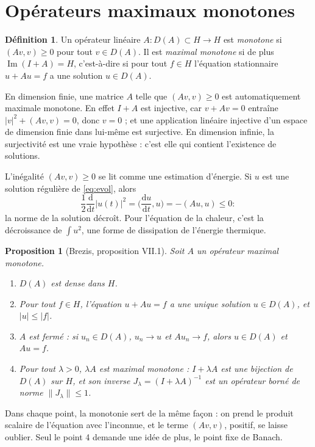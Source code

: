 \documentclass[11pt,a4paper]{article}
\theoremstyle{plain}
\newtheorem{proposition}[theoreme]{Proposition}
\theoremstyle{definition}
\newtheorem{definition}[theoreme]{Définition}
\theoremstyle{remark}
\newcommand{\dt}{\frac{\mathrm{d}}{\mathrm{d}t}}
\DeclareMathOperator{\Ima}{Im}
\begin{document}
\section{Opérateurs maximaux monotones}

\begin{definition}
Un opérateur linéaire $A : D(A)\subset H\to H$ est \emph{monotone} si $(Av,v)\geq0$ pour tout $v\in D(A)$. Il est \emph{maximal monotone} si de plus $\Ima(I+A)=H$, c'est-à-dire si pour tout $f\in H$ l'équation stationnaire $u+Au=f$ a une solution $u\in D(A)$.
\end{definition}

En dimension finie, une matrice $A$ telle que $(Av,v)\geq0$ est automatiquement maximale monotone. En effet $I+A$ est injective, car $v+Av=0$ entraîne $|v|^2+(Av,v)=0$, donc $v=0$ ; et une application linéaire injective d'un espace de dimension finie dans lui-même est surjective. En dimension infinie, la surjectivité est une vraie hypothèse : c'est elle qui contient l'existence de solutions.

L'inégalité $(Av,v)\geq0$ se lit comme une estimation d'énergie. Si $u$ est une solution régulière de \eqref{eq:evol}, alors
\[
  \frac12\dt|u(t)|^2=\Big(\frac{\mathrm{d}u}{\mathrm{d}t},u\Big)=-(Au,u)\leq0 :
\]
la norme de la solution décroît. Pour l'équation de la chaleur, c'est la décroissance de $\int u^2$, une forme de dissipation de l'énergie thermique.

\begin{proposition}[Brezis, proposition VII.1]\label{prop:maxmono}
Soit $A$ un opérateur maximal monotone.
\begin{enumerate}[nosep]
\item $D(A)$ est dense dans $H$.
\item Pour tout $f\in H$, l'équation $u+Au=f$ a une unique solution $u\in D(A)$, et $|u|\leq|f|$.
\item $A$ est fermé : si $u_n\in D(A)$, $u_n\to u$ et $Au_n\to f$, alors $u\in D(A)$ et $Au=f$.
\item Pour tout $\lambda>0$, $\lambda A$ est maximal monotone : $I+\lambda A$ est une bijection de $D(A)$ sur $H$, et son inverse $J_\lambda=(I+\lambda A)^{-1}$ est un opérateur borné de norme $\|J_\lambda\|\leq1$.
\end{enumerate}
\end{proposition}

Dans chaque point, la monotonie sert de la même façon : on prend le produit scalaire de l'équation avec l'inconnue, et le terme $(Av,v)$, positif, se laisse oublier. Seul le point 4 demande une idée de plus, le point fixe de Banach.
\end{document}
